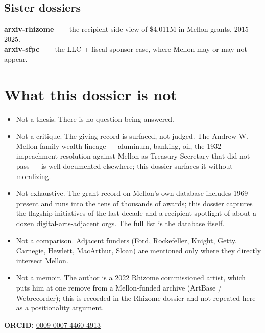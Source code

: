 \documentclass[10pt,letterpaper,twocolumn]{article}
\begin{document}
\subsection{Sister dossiers}

\textbf{arxiv-rhizome}~\citep{rhizomedossier} --- the recipient-side view of \$4.011M in Mellon grants, 2015--2025.\\
\textbf{arxiv-sfpc}~\citep{sfpcdossier} --- the LLC + fiscal-sponsor case, where Mellon may or may not appear.

\section{What this dossier is not}

\begin{itemize}
\item Not a thesis. There is no question being answered.
\item Not a critique. The giving record is surfaced, not judged. The Andrew W. Mellon family-wealth lineage --- aluminum, banking, oil, the 1932 impeachment-resolution-against-Mellon-as-Treasury-Secretary that did not pass --- is well-documented elsewhere; this dossier surfaces it without moralizing.
\item Not exhaustive. The grant record on Mellon's own database includes 1969--present and runs into the tens of thousands of awards; this dossier captures the flagship initiatives of the last decade and a recipient-spotlight of about a dozen digital-arts-adjacent orgs. The full list is the database itself.
\item Not a comparison. Adjacent funders (Ford, Rockefeller, Knight, Getty, Carnegie, Hewlett, MacArthur, Sloan) are mentioned only where they directly intersect Mellon.
\item Not a memoir. The author is a 2022 Rhizome commissioned artist, which puts him at one remove from a Mellon-funded archive (ArtBase / Webrecorder); this is recorded in the Rhizome dossier and not repeated here as a positionality argument.
\end{itemize}

\vspace{0.5em}
\noindent\textbf{ORCID:} \href{https://orcid.org/0009-0007-4460-4913}{0009-0007-4460-4913}



\end{document}
